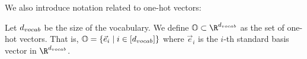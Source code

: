 We also introduce notation related to one-hot vectors:
\begin{definition}
	\label{def:one_hot_space}
	Let ${d_{vocab}}$ be the size of the vocabulary.
	We define $\OneHotSpace \subset \R^\dVocab$ as the set of one-hot vectors.
	That is, $\mathbb{O} = \{ \vec{e}_i \mid i \in [{d_{vocab}}] \}$ where $\vec{e}_i$ is the $i$-th standard basis vector in $\R^{\dVocab}$.
\end{definition}

%
%
